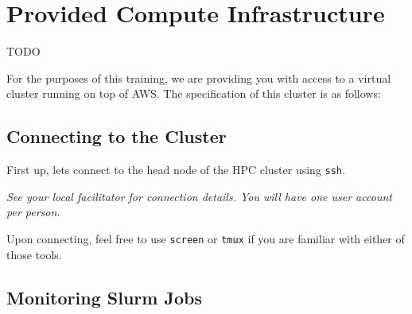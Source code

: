 \section{Provided Compute Infrastructure}

TODO

For the purposes of this training, we are providing you with access to a virtual cluster running on top of AWS.
The specification of this cluster is as follows:


\subsection{Connecting to the Cluster}

\begin{steps}
First up, lets connect to the head node of the HPC cluster using \texttt{ssh}.

\emph{See your local facilitator for connection details. You will have one user account per person.}

Upon connecting, feel free to use \texttt{screen} or \texttt{tmux} if you are familiar with either of those tools.

\end{steps}

\subsection{Monitoring Slurm Jobs}

